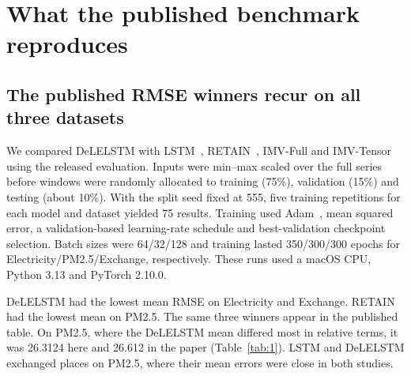 \documentclass[10pt,a4paper]{article}
\begin{document}
\section{What the published benchmark reproduces}\label{sec:replication}
\subsection{The published RMSE winners recur on all three datasets}
We compared DeLELSTM with LSTM~\cite{lstm}, RETAIN~\cite{retain}, IMV-Full and IMV-Tensor~\cite{imv} using the released evaluation. Inputs were min--max scaled over the full series before windows were randomly allocated to training (75\%), validation (15\%) and testing (about 10\%). With the split seed fixed at 555, five training repetitions for each model and dataset yielded 75 results. Training used Adam~\cite{adam}, mean squared error, a validation-based learning-rate schedule and best-validation checkpoint selection. Batch sizes were 64/32/128 and training lasted 350/300/300 epochs for Electricity/PM2.5/Exchange, respectively. These runs used a macOS CPU, Python 3.13 and PyTorch 2.10.0.

DeLELSTM had the lowest mean RMSE on Electricity and Exchange. RETAIN had the lowest mean on PM2.5. The same three winners appear in the published table. On PM2.5, where the DeLELSTM mean differed most in relative terms, it was 26.3124 here and 26.612 in the paper (Table~\ref{tab:1}). LSTM and DeLELSTM exchanged places on PM2.5, where their mean errors were close in both studies.
\end{document}
